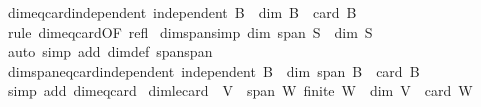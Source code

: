 \begin{isabellebody}
\endisatagproof
{\isafoldproof}%
%
\isadelimproof
\isanewline
%
\endisadelimproof
\isanewline
{}\isamarkupfalse%
\ dim{\isacharunderscore}{\kern0pt}eq{\isacharunderscore}{\kern0pt}card{\isacharunderscore}{\kern0pt}independent{\isacharcolon}{\kern0pt}\ {\isachardoublequoteopen}independent\ B\ {\isasymLongrightarrow}\ dim\ B\ {\isacharequal}{\kern0pt}\ card\ B{\isachardoublequoteclose}\isanewline
%
\isadelimproof
\ \ %
\endisadelimproof
%
\isatagproof
{}\isamarkupfalse%
\ {\isacharparenleft}{\kern0pt}rule\ dim{\isacharunderscore}{\kern0pt}eq{\isacharunderscore}{\kern0pt}card{\isacharbrackleft}{\kern0pt}OF\ refl{\isacharbrackright}{\kern0pt}{\isacharparenright}{\kern0pt}%
\endisatagproof
{\isafoldproof}%
%
\isadelimproof
\isanewline
%
\endisadelimproof
\isanewline
{}\isamarkupfalse%
\ dim{\isacharunderscore}{\kern0pt}span{\isacharbrackleft}{\kern0pt}simp{\isacharbrackright}{\kern0pt}{\isacharcolon}{\kern0pt}\ {\isachardoublequoteopen}dim\ {\isacharparenleft}{\kern0pt}span\ S{\isacharparenright}{\kern0pt}\ {\isacharequal}{\kern0pt}\ dim\ S{\isachardoublequoteclose}\isanewline
%
\isadelimproof
\ \ %
\endisadelimproof
%
\isatagproof
{}\isamarkupfalse%
\ {\isacharparenleft}{\kern0pt}auto\ simp\ add{\isacharcolon}{\kern0pt}\ dim{\isacharunderscore}{\kern0pt}def\ span{\isacharunderscore}{\kern0pt}span{\isacharparenright}{\kern0pt}%
\endisatagproof
{\isafoldproof}%
%
\isadelimproof
\isanewline
%
\endisadelimproof
\isanewline
{}\isamarkupfalse%
\ dim{\isacharunderscore}{\kern0pt}span{\isacharunderscore}{\kern0pt}eq{\isacharunderscore}{\kern0pt}card{\isacharunderscore}{\kern0pt}independent{\isacharcolon}{\kern0pt}\ {\isachardoublequoteopen}independent\ B\ {\isasymLongrightarrow}\ dim\ {\isacharparenleft}{\kern0pt}span\ B{\isacharparenright}{\kern0pt}\ {\isacharequal}{\kern0pt}\ card\ B{\isachardoublequoteclose}\isanewline
%
\isadelimproof
\ \ %
\endisadelimproof
%
\isatagproof
{}\isamarkupfalse%
\ {\isacharparenleft}{\kern0pt}simp\ add{\isacharcolon}{\kern0pt}\ dim{\isacharunderscore}{\kern0pt}eq{\isacharunderscore}{\kern0pt}card{\isacharparenright}{\kern0pt}%
\endisatagproof
{\isafoldproof}%
%
\isadelimproof
\isanewline
%
\endisadelimproof
\isanewline
{}\isamarkupfalse%
\ dim{\isacharunderscore}{\kern0pt}le{\isacharunderscore}{\kern0pt}card{\isacharcolon}{\kern0pt}\ \ {\isachardoublequoteopen}V\ {\isasymsubseteq}\ span\ W{\isachardoublequoteclose}\ {\isachardoublequoteopen}finite\ W{\isachardoublequoteclose}\ \ {\isachardoublequoteopen}dim\ V\ {\isasymle}\ card\ W{\isachardoublequoteclose}\isanewline

\end{isabellebody}
